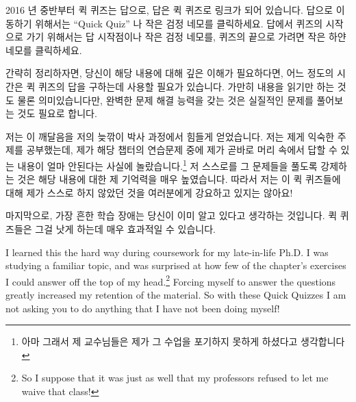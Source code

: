 {2016 년 중반부터 퀵 퀴즈는 답으로, 답은 퀵 퀴즈로 링크가 되어 있습니다.
답으로 이동하기 위해서는 ``Quick Quiz'' 나 작은 검정 네모를 클릭하세요.
답에서 퀴즈의 시작으로 가기 위해서는 답 시작점이나 작은 검정 네모를, 퀴즈의
끝으로 가려면 작은 하얀 네모를 클릭하세요.
\iffalse

Note that as of mid-2016 the quick quizzes are hyperlinked
to the answers and vice versa.
Click either the ``Quick Quiz'' heading or the small black square
to move to the beginning of the answer.
From the answer, click on the heading or the small black square to
move to the beginning of the quiz, or, alternatively, click on the
small white square at the end of the answer to move to the end of the
corresponding quiz.
\fi
} \QuickQuizEnd

간략히 정리하자면, 당신이 해당 내용에 대해 깊은 이해가 필요하다면, 어느 정도의
시간은 퀵 퀴즈의 답을 구하는데 사용할 필요가 있습니다.
가만히 내용을 읽기만 하는 것도 물론 의미있습니다만, 완벽한 문제 해결 능력을
갖는 것은 실질적인 문제를 풀어보는 것도 필요로 합니다.

\iffalse
In short, if you need a deep
understanding of the material, then you should invest some time
into answering the Quick Quizzes.
Don't get me wrong, passively reading the material can be quite
valuable, but gaining full problem-solving capability really
does require that you practice solving problems.
\fi

저는 이 깨달음을 저의 늦깎이 박사 과정에서 힘들게 얻었습니다.  저는 제게 익숙한
주제를 공부했는데, 제가 해당 챕터의 연습문제 중에 제가 곧바로 머리 속에서 답할
수 있는 내용이 얼마 안된다는 사실에 놀랐습니다.\footnote{ 아마 그래서 제
교수님들은 제가 그 수업을 포기하지 못하게 하셨다고 생각합니다} 저 스스로를 그
문제들을 풀도록 강제하는 것은 해당 내용에 대한 제 기억력을 매우 높였습니다.
따라서 저는 이 퀵 퀴즈들에 대해 제가 스스로 하지 않았던 것을 여러분에게
강요하고 있지는 않아요!

마지막으로, 가장 흔한 학습 장애는 당신이 이미 알고 있다고 생각하는 것입니다.
퀵 퀴즈들은 그걸 낫게 하는데 매우 효과적일 수 있습니다.

\iffalse
I learned this the hard way during coursework for my late-in-life
Ph.D.
I was studying a familiar topic, and was surprised at how few of
the chapter's exercises I could answer off the top of my head.\footnote{
	So I suppose that it was just as well that my professors refused
	to let me waive that class!}
Forcing myself to answer the questions greatly increased my
retention of the material.
So with these Quick Quizzes I am not asking you to do anything
that I have not been doing myself!

